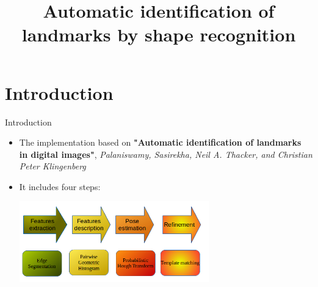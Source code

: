 \documentclass{beamer}
\title{Automatic identification of landmarks by shape recognition}
\begin{document}
\frame{\titlepage}
\section{Introduction}
\begin{frame}{Introduction}
	\begin{itemize}
	\item The implementation based on \textbf{"Automatic identification of landmarks in digital images"}, \textit{Palaniswamy, Sasirekha, Neil A. Thacker, and Christian Peter Klingenberg} \\
	\item It includes four steps:
		\begin{center}
			\includegraphics[height=3.5cm]{images/flow_step.png}	
		\end{center}
	\end{itemize}
\end{frame}
\end{document}
